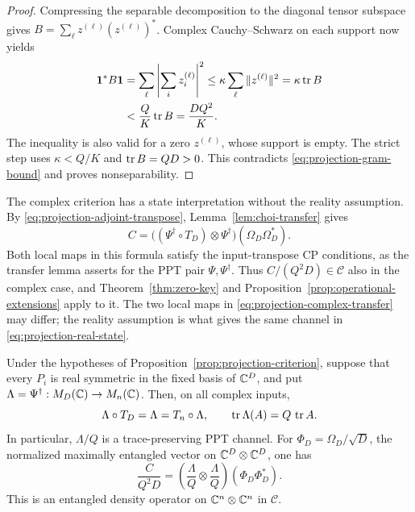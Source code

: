 \begin{proof}
Compressing the separable decomposition to the diagonal tensor
subspace gives \(B=\sum_\ell z^{(\ell)}(z^{(\ell)})^*\).
Complex Cauchy--Schwarz on each support now yields
\begin{equation}
 \begin{aligned}
 \mathbf1^*B\mathbf1
  &=\sum_\ell\left|\sum_i z_i^{(\ell)}\right|^2
    \leq \kappa\sum_\ell\|z^{(\ell)}\|^2
     =\kappa\operatorname{tr} B\\
  &<\frac{Q}{K}\operatorname{tr} B
     =\frac{DQ^2}{K}.
 \end{aligned}
 \label{eq:projection-separable-bound}
\end{equation}
The inequality is also valid for a zero \(z^{(\ell)}\), whose support
is empty.  The strict step uses \(\kappa<Q/K\) and
\(\operatorname{tr} B=QD>0\).  This contradicts
\eqref{eq:projection-gram-bound} and proves nonseparability.
\end{proof}

The complex criterion has a state interpretation
without the reality assumption.  By
\eqref{eq:projection-adjoint-transpose}, Lemma~\ref{lem:choi-transfer}
gives
\begin{equation}\label{eq:projection-complex-transfer}
 C=
 \bigl((\Psi^\dagger\circ T_D)\otimes\Psi^\dagger\bigr)
       (\Omega_D\Omega_D^*).
\end{equation}
Both local maps in this formula satisfy the input-transpose CP
conditions, as the transfer lemma asserts for the PPT pair
\(\Psi,\Psi^\dagger\).  Thus \(C/(Q^2D)\in\mathscr C\) also in the
complex case, and Theorem~\ref{thm:zero-key} and
Proposition~\ref{prop:operational-extensions} apply to it.  The two local
maps in \eqref{eq:projection-complex-transfer} may differ; the reality
assumption is what gives the same channel in
\eqref{eq:projection-real-state}.

\begin{corollary}
\label{cor:real-channel}
Under the hypotheses of Proposition~\ref{prop:projection-criterion},
suppose that every \(P_i\) is real symmetric in the fixed basis of
\(\mathbb C^D\), and put \(\Lambda=\Psi^\dagger:M_{D}(\mathbb C)\to M_{n}(\mathbb C)\).
Then, on all complex inputs,
\begin{equation}\label{eq:projection-real-invariances}
 \Lambda\circ T_D=\Lambda=T_n\circ\Lambda,
 \qquad \operatorname{tr}\Lambda(A)=Q\,\operatorname{tr} A.
\end{equation}
In particular, \(\Lambda/Q\) is a trace-preserving PPT channel.
For \(\Phi_D=\Omega_D/\sqrt D\), the normalized maximally entangled
vector on \(\mathbb C^D\otimes\mathbb C^D\), one has
\begin{equation}\label{eq:projection-real-state}
 \frac{C}{Q^2D}
 =
 \left(\frac{\Lambda}{Q}\otimes\frac{\Lambda}{Q}\right)
       (\Phi_D\Phi_D^*).
\end{equation}
This is an entangled density operator on \(\mathbb C^n\otimes\mathbb C^n\) in
\(\mathscr C\).
\end{corollary}

